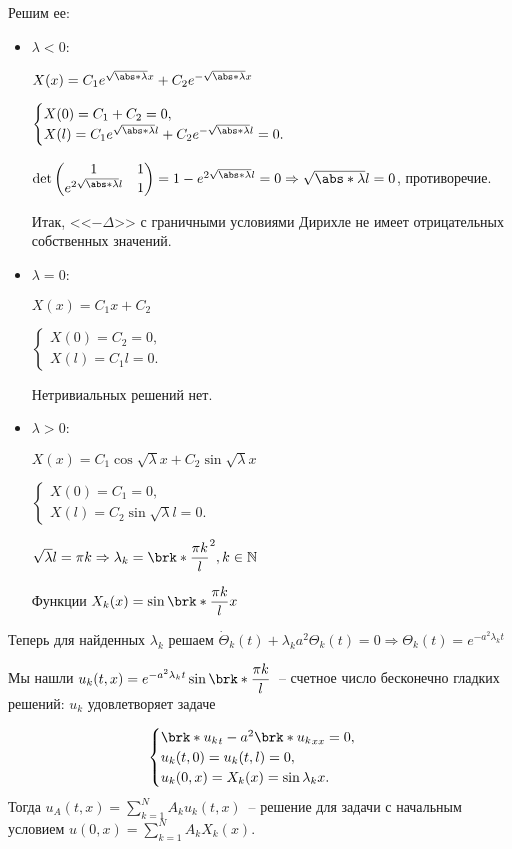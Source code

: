 Решим ее:
\begin{itemize}
	\item $\lambda < 0$:

		$X(x) = C_1e^{\sqrt{\abs*{\lambda}}x} + C_2e^{-\sqrt{\abs*{\lambda}}x}$

			$\begin{cases}
				X(0) = C_1 + C_2 = 0, \\
				X(l) = C_1e^{\sqrt{\abs*{\lambda}}l} + C_2e^{-\sqrt{\abs*{\lambda}}l} = 0.
			\end{cases}$

			$\text{det}\begin{pmatrix} 1 & 1 \\ e^{2\sqrt{\abs*{\lambda}}l} & 1 \end{pmatrix} = 1 - e^{2\sqrt{\abs*{\lambda}}l} = 0 \Rightarrow \sqrt{\abs*{\lambda}}l = 0$, противоречие.

			Итак, <<$-\Delta$>> с граничными условиями Дирихле не имеет отрицательных собственных значений.

	\item $\lambda = 0$:

		$X(x) = C_1x + C_2$

		$\begin{cases}
			X(0) = C_2 = 0, \\
			X(l) = C_1l = 0.
		\end{cases}$

		Нетривиальных решений нет.

	\item $\lambda > 0$:

		$X(x) = C_1\cos\sqrt{\lambda}x + C_2\sin\sqrt{\lambda}x$

		$\begin{cases}
			X(0) = C_1 = 0, \\
			X(l) = C_2\sin\sqrt{\lambda}l = 0.
		\end{cases}$

		$\sqrt{\lambda}l = \pi k \Rightarrow \lambda_k = \brk*{\dfrac{\pi k}{l}}^2, k \in \N$

		Функции $X_k(x) = \sin\brk*{\dfrac{\pi k}{l}x}$
\end{itemize}
Теперь для найденных $\lambda_k$ решаем $\dot{\Theta}_k(t) + \lambda_k a^2 \Theta_k(t) = 0 \Rightarrow \Theta_k(t) = e^{-a^2\lambda_kt}$

Мы нашли $u_k(t,x) = e^{-a^2\lambda_kt}\sin\brk*{\dfrac{\pi k}{l}}$~-- счетное число бесконечно гладких решений: $u_k$ удовлетворяет задаче

\begin{equation*}
	\begin{cases}
		\brk*{u_k}_t - a^2\brk*{u_k}_{xx} = 0, \\
		u_k(t,0) = u_k(t,l) = 0, \\
		u_k(0,x) = X_k(x) = \sin\lambda_kx.
	\end{cases}
\end{equation*}
Тогда $u_A(t,x) = \displaystyle\sum\limits_{k=1}^N A_k u_k(t,x)$~-- решение для задачи с начальным условием $u(0,x) = \displaystyle\sum\limits_{k=1}^N A_k X_k(x)$.

